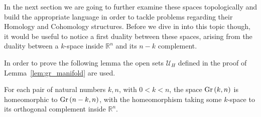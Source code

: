In the next section we are going to further examine these spaces topologically and build the appropriate language in order to tackle problems regarding their Homology and Cohomology structures. Before we dive in into this topic though, it would be useful to notice a first duality between these spaces, arising from the duality between a $k$-space inside $\mathbb{R}^n$ and its $n-k$ complement.

In order to prove the following lemma the open sets $\mathcal{U}_H$ defined in the proof of Lemma~\ref{lem:gr_manifold} are used.


\begin{lemma} \label{lem:gr_duality}
	For each pair of natural numbers $k,n$, with $0<k<n$, the space $\Gr{k}{n}$ is homeomorphic to $\Gr{n-k}{n}$, with the homeomorphism taking some $k$-space to its orthogonal complement inside $\mathbb{R}^n$.
\end{lemma}

